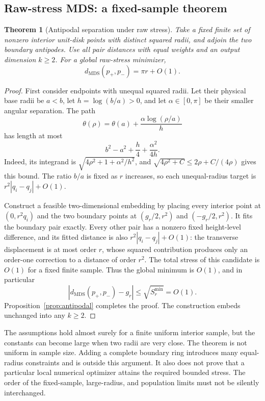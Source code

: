 \documentclass[11pt]{article}
\newtheorem{theorem}[proposition]{Theorem}
\theoremstyle{remark}\newtheorem{remark}[proposition]{Remark}
\begin{document}
\subsection{Raw-stress MDS: a fixed-sample theorem}
\begin{theorem}[Antipodal separation under raw stress]\label{thm:raw-antipodal}
Take a fixed finite set of nonzero interior unit-disk points with distinct
squared radii, and adjoin the two boundary antipodes. Use all pair distances
with equal weights and an output dimension $k\ge2$. For a global raw-stress
minimizer,
\begin{equation}\label{eq:raw-antipodal}
 d_{\mathrm{MDS}}(p_+,p_-)=\pi r+O(1).
\end{equation}
\end{theorem}
\begin{proof}
First consider endpoints with unequal squared radii. Let their physical base
radii be $a<b$, let $h=\log(b/a)>0$, and let $\alpha\in[0,\pi]$ be their
smaller angular separation. The path
\begin{equation}
 \theta(\rho)=\theta(a)+\frac{\alpha\log(\rho/a)}h
\end{equation}
has length at most
\begin{equation}\label{eq:log-path}
 b^2-a^2+\frac h4+\frac{\alpha^2}{4h}.
\end{equation}
Indeed, its integrand is $\sqrt{4\rho^2+1+\alpha^2/h^2}$, and
$\sqrt{4\rho^2+C}\le2\rho+C/(4\rho)$ gives this bound. The ratio $b/a$ is
fixed as $r$ increases, so each unequal-radius target is
$r^2|q_i-q_j|+O(1)$.

Construct a feasible two-dimensional embedding by placing every interior
point at $(0,r^2q_i)$ and the two boundary points at
$(g_r/2,r^2)$ and $(-g_r/2,r^2)$. It fits the boundary pair exactly. Every
other pair has a nonzero fixed height-level difference, and its fitted
distance is also $r^2|q_i-q_j|+O(1)$: the transverse displacement is at most
order $r$, whose squared contribution produces only an order-one correction
to a distance of order $r^2$. The total stress of this candidate is $O(1)$
for a fixed finite sample. Thus the global minimum is $O(1)$, and in particular
\begin{equation}
 |d_{\mathrm{MDS}}(p_+,p_-)-g_r|\le\sqrt{S_r^{\min}}=O(1).
\end{equation}
Proposition~\ref{prop:antipodal} completes the proof. The construction embeds
unchanged into any $k\ge2$.
\end{proof}

The assumptions hold almost surely for a finite uniform interior sample, but
the constants can become large when two radii are very close. The theorem is
not uniform in sample size. Adding a complete boundary ring introduces many
equal-radius constraints and is outside this argument. It also does not prove
that a particular local numerical optimizer attains the required bounded
stress. The order of the fixed-sample, large-radius, and population limits
must not be silently interchanged.
\end{document}
